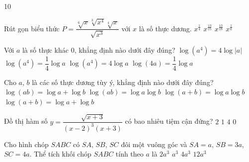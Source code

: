 \begin{indapan}{10}
\begin{ex}%
	Rút gọn biểu thức $P=\dfrac{\sqrt[6]{x}\sqrt[3]{x^4}\sqrt[4]{x}}{\sqrt{x^3}}$ với $x$ là số thực dương.
	\choice
	{\True $x^{\tfrac{1}{4}}$}
	{$x^{\tfrac{13}{15}}$}
	{$x^{\tfrac{13}{18}}$}
	{$x^{\tfrac{1}{6}}$}
\end{ex}

\begin{ex}%
	Với $a$ là số thực khác $0$, khẳng định nào dưới đây đúng?
	\choice
	{\True $\log(a^4)=4\log|a|$}
	{$\log(a^4)=\dfrac{1}{4}\log a$}
	{$\log(a^4)=4\log a$}
	{$\log(4a)=\dfrac{1}{4}\log a$}
\end{ex}

\begin{ex}%
	Cho $a$, $b$ là các số thực dương tùy ý, khẳng định nào dưới đây đúng?
	\choice
	{\True $\log(ab)=\log a+\log b$}
	{$\log(ab)=\log a\log b$}
	{$\log(a+b)=\log a\log b$}
	{$\log(a+b)=\log a+\log b$}
\end{ex}

\begin{ex}%
	Đồ thị hàm số $y=\dfrac{\sqrt{x+3}}{(x-2)^3(x+3)}$ có bao nhiêu tiệm cận đứng?
	\choice
	{\True $2$}
	{$1$}
	{$4$}
	{$0$}
\end{ex}

\begin{ex}%
	Cho hình chóp $SABC$ có $SA$, $SB$, $SC$ đôi một vuông góc và $SA=a$, $SB=3a$, $SC=4a$. Thể tích khối chóp $SABC$ tính theo $a$ là
	\choice
	{\True $2a^3$}
	{$a^3$}
	{$4a^3$}
	{$12a^3$}
\end{ex}


\end{indapan}
